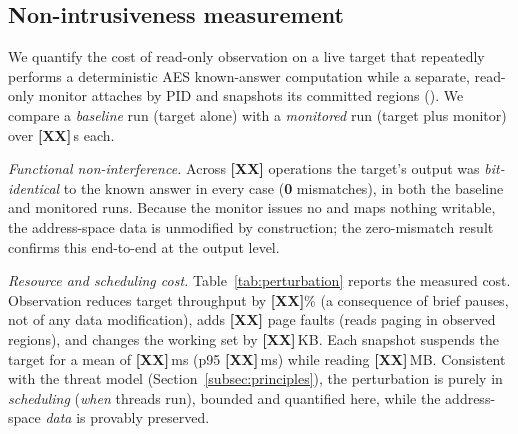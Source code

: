
\subsection{Non-intrusiveness measurement}
\label{subsec:perturbation}
We quantify the cost of read-only observation on a live target that repeatedly performs a
deterministic AES known-answer computation while a separate, read-only monitor attaches by
PID and snapshots its committed regions (). We compare a
\emph{baseline} run (target alone) with a \emph{monitored} run (target plus monitor) over
\textbf{[XX]}\,s each.

\emph{Functional non-interference.} Across \textbf{[XX]} operations the target's output was
\emph{bit-identical} to the known answer in every case (\textbf{0} mismatches), in both the
baseline and monitored runs. Because the monitor issues no  and
maps nothing writable, the address-space data is unmodified by construction; the
zero-mismatch result confirms this end-to-end at the output level.

\emph{Resource and scheduling cost.} Table~\ref{tab:perturbation} reports the measured cost.
Observation reduces target throughput by \textbf{[XX]}\% (a consequence of brief
 pauses, not of any data modification), adds \textbf{[XX]} page faults
(reads paging in observed regions), and changes the working set by \textbf{[XX]}\,KB. Each
snapshot suspends the target for a mean of \textbf{[XX]}\,ms (p95 \textbf{[XX]}\,ms) while
reading \textbf{[XX]}\,MB. Consistent with the threat model (Section~\ref{subsec:principles}),
the perturbation is purely in \emph{scheduling} (\emph{when} threads run), bounded and
quantified here, while the address-space \emph{data} is provably preserved.


